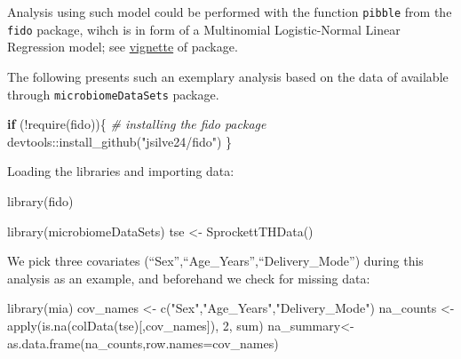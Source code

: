 \documentclass[
]{book}
\newenvironment{Shaded}{\begin{snugshade}}{\end{snugshade}}
\newcommand{\AttributeTok}[1]{\textcolor[rgb]{0.77,0.63,0.00}{#1}}
\newcommand{\CommentTok}[1]{\textcolor[rgb]{0.56,0.35,0.01}{\textit{#1}}}
\newcommand{\ControlFlowTok}[1]{\textcolor[rgb]{0.13,0.29,0.53}{\textbf{#1}}}
\newcommand{\DecValTok}[1]{\textcolor[rgb]{0.00,0.00,0.81}{#1}}
\newcommand{\FunctionTok}[1]{\textcolor[rgb]{0.00,0.00,0.00}{#1}}
\newcommand{\NormalTok}[1]{#1}
\newcommand{\OtherTok}[1]{\textcolor[rgb]{0.56,0.35,0.01}{#1}}
\newcommand{\SpecialCharTok}[1]{\textcolor[rgb]{0.00,0.00,0.00}{#1}}
\newcommand{\StringTok}[1]{\textcolor[rgb]{0.31,0.60,0.02}{#1}}
\begin{document}
Analysis using such model could be performed with the function
\texttt{pibble} from the \texttt{fido} package, wihch is in form of a Multinomial
Logistic-Normal Linear Regression model; see
\href{https://jsilve24.github.io/fido/articles/introduction-to-fido.html}{vignette}
of package.

The following presents such an exemplary analysis based on the
data of \citet{Sprockett2020} available
through \texttt{microbiomeDataSets} package.

\begin{Shaded}
\begin{Highlighting}[]
\ControlFlowTok{if}\NormalTok{ (}\SpecialCharTok{!}\FunctionTok{require}\NormalTok{(fido))\{}
  \CommentTok{\# installing the fido package}
\NormalTok{  devtools}\SpecialCharTok{::}\FunctionTok{install\_github}\NormalTok{(}\StringTok{"jsilve24/fido"}\NormalTok{)}
\NormalTok{\}}
\end{Highlighting}
\end{Shaded}

Loading the libraries and importing data:

\begin{Shaded}
\begin{Highlighting}[]
\FunctionTok{library}\NormalTok{(fido)}
\end{Highlighting}
\end{Shaded}

\begin{Shaded}
\begin{Highlighting}[]
\FunctionTok{library}\NormalTok{(microbiomeDataSets)}
\NormalTok{tse }\OtherTok{\textless{}{-}} \FunctionTok{SprockettTHData}\NormalTok{()}
\end{Highlighting}
\end{Shaded}

We pick three covariates (``Sex'',``Age\_Years'',``Delivery\_Mode'') during this
analysis as an example, and beforehand we check for missing data:

\begin{Shaded}
\begin{Highlighting}[]
\FunctionTok{library}\NormalTok{(mia)}
\NormalTok{cov\_names }\OtherTok{\textless{}{-}} \FunctionTok{c}\NormalTok{(}\StringTok{"Sex"}\NormalTok{,}\StringTok{"Age\_Years"}\NormalTok{,}\StringTok{"Delivery\_Mode"}\NormalTok{)}
\NormalTok{na\_counts }\OtherTok{\textless{}{-}} \FunctionTok{apply}\NormalTok{(}\FunctionTok{is.na}\NormalTok{(}\FunctionTok{colData}\NormalTok{(tse)[,cov\_names]), }\DecValTok{2}\NormalTok{, sum)}
\NormalTok{na\_summary}\OtherTok{\textless{}{-}}\FunctionTok{as.data.frame}\NormalTok{(na\_counts,}\AttributeTok{row.names=}\NormalTok{cov\_names)}
\end{Highlighting}
\end{Shaded}
\end{document}
